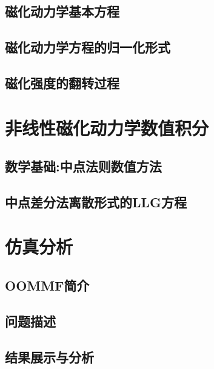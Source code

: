	\section{磁化动力学基本方程}
	
	\section{磁化动力学方程的归一化形式}
	
	\section{磁化强度的翻转过程}
	
	\chapter{非线性磁化动力学数值积分}
	\section{数学基础:中点法则数值方法}
	\section{中点差分法离散形式的LLG方程}
	
	\chapter{仿真分析}
	\section{OOMMF简介}
	\section{问题描述}
	\section{结果展示与分析}